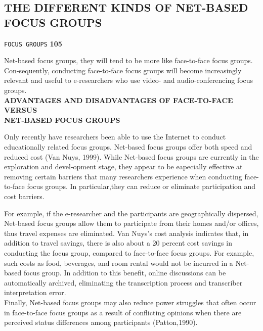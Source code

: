 \documentclass[a4,9pt]{beamer}
\begin{document}
\begin{frame}
\section*{THE DIFFERENT KINDS OF NET-BASED FOCUS GROUPS }
\begin{flushright}
 \texttt{FOCUS GROUPS} \hspace*{1cm} \textbf{105}
\end{flushright}

\vspace*{0.5cm}
Net-based focus groups, they will tend to be more like face-to-face focus groups. Con-sequently, conducting face-to-face focus groups will become increasingly relevant and useful to e-researchers who use video- and audio-conferencing focus groups.\\

\vspace*{0.3cm}
\large{
\textbf{ADVANTAGES AND DISADVANTAGES OF FACE-TO-FACE VERSUS\\
NET-BASED FOCUS GROUPS \\}
}

\vspace*{0.2cm}
Only recently have researchers been able to use the Internet to conduct educationally related focus groups. Net-based focus groups offer both speed and reduced cost (Van Nuys, 1999). While Net-based focus groups are currently in the exploration and devel-opment stage, they appear to be eapecially effective at removing certain barriers that many researchers experience when conducting face-to-face focus groups. In particular,they can reduce or eliminate participation and cost barriers.
\end{frame}

\begin{frame}
For example, if the e-researcher and the participants are geographically dispersed, Net-based focus groups allow them to participate from their homes and/or offices, thus travel expenses are eliminated. Van Nuys's cost analysis indicates that, in addition to travel savings, there is also about a 20 percent cost savings in conducting the focus group, compared to face-to-face focus groups. For example, such costs as food, beverages, and room rental would not be incurred in a Net-based focus group. In addition to this benefit, online discussions can be automatically archived, eliminating the transcription process and transcriber interpretation error.\\
\hspace*{0.5cm} Finally, Net-based focus groups may also reduce power struggles that often occur in face-to-face focus groups as a result of conflicting opinions when there are perceived status differences among participants (Patton,1990).
\end{frame}
\end{document}
